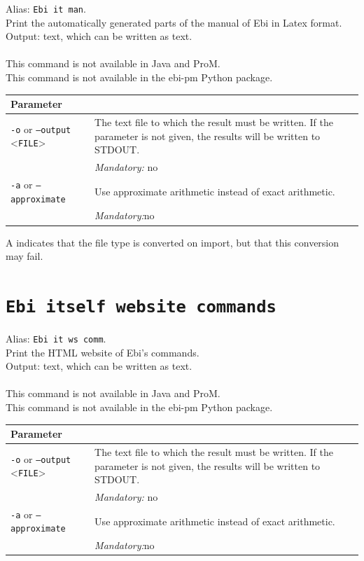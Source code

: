 {\label{command:Ebi itself manual}
Alias: \texttt{Ebi it man}.\\
Print the automatically generated parts of the manual of Ebi in Latex format.\\
\noindent Output: text, which can be written as  text.\\
\\This command is not available in Java and ProM.
\\This command is not available in the ebi-pm Python package.
\begin{tabularx}{\linewidth}{lX}
\toprule
Parameter \\\midrule
\texttt{-o} or \texttt{--output} <\texttt{FILE}> &
The text file to which the result must be written. If the parameter is not given, the results will be written to STDOUT.\\
&\textit{Mandatory:} \quad no\\
\texttt{-a} or \texttt{--approximate} & Use approximate arithmetic instead of exact arithmetic.\\
&\textit{Mandatory:}\quad no\\
\bottomrule
\end{tabularx}
A \textdagger{} indicates that the file type is converted on import, but that this conversion may fail.
\clearpage\section{\texttt{Ebi itself website commands}}
\label{command:Ebi itself website commands}
Alias: \texttt{Ebi it ws comm}.\\
Print the HTML website of Ebi's commands.\\
\noindent Output: text, which can be written as  text.\\
\\This command is not available in Java and ProM.
\\This command is not available in the ebi-pm Python package.
\begin{tabularx}{\linewidth}{lX}
\toprule
Parameter \\\midrule
\texttt{-o} or \texttt{--output} <\texttt{FILE}> &
The text file to which the result must be written. If the parameter is not given, the results will be written to STDOUT.\\
&\textit{Mandatory:} \quad no\\
\texttt{-a} or \texttt{--approximate} & Use approximate arithmetic instead of exact arithmetic.\\
&\textit{Mandatory:}\quad no\\

\end{tabularx}}
